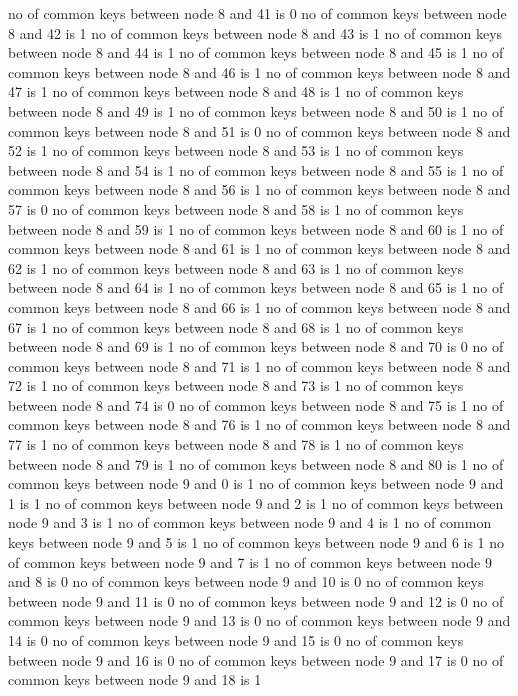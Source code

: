 no of common keys between node 8 and 41 is 0
no of common keys between node 8 and 42 is 1
no of common keys between node 8 and 43 is 1
no of common keys between node 8 and 44 is 1
no of common keys between node 8 and 45 is 1
no of common keys between node 8 and 46 is 1
no of common keys between node 8 and 47 is 1
no of common keys between node 8 and 48 is 1
no of common keys between node 8 and 49 is 1
no of common keys between node 8 and 50 is 1
no of common keys between node 8 and 51 is 0
no of common keys between node 8 and 52 is 1
no of common keys between node 8 and 53 is 1
no of common keys between node 8 and 54 is 1
no of common keys between node 8 and 55 is 1
no of common keys between node 8 and 56 is 1
no of common keys between node 8 and 57 is 0
no of common keys between node 8 and 58 is 1
no of common keys between node 8 and 59 is 1
no of common keys between node 8 and 60 is 1
no of common keys between node 8 and 61 is 1
no of common keys between node 8 and 62 is 1
no of common keys between node 8 and 63 is 1
no of common keys between node 8 and 64 is 1
no of common keys between node 8 and 65 is 1
no of common keys between node 8 and 66 is 1
no of common keys between node 8 and 67 is 1
no of common keys between node 8 and 68 is 1
no of common keys between node 8 and 69 is 1
no of common keys between node 8 and 70 is 0
no of common keys between node 8 and 71 is 1
no of common keys between node 8 and 72 is 1
no of common keys between node 8 and 73 is 1
no of common keys between node 8 and 74 is 0
no of common keys between node 8 and 75 is 1
no of common keys between node 8 and 76 is 1
no of common keys between node 8 and 77 is 1
no of common keys between node 8 and 78 is 1
no of common keys between node 8 and 79 is 1
no of common keys between node 8 and 80 is 1
no of common keys between node 9 and 0 is 1
no of common keys between node 9 and 1 is 1
no of common keys between node 9 and 2 is 1
no of common keys between node 9 and 3 is 1
no of common keys between node 9 and 4 is 1
no of common keys between node 9 and 5 is 1
no of common keys between node 9 and 6 is 1
no of common keys between node 9 and 7 is 1
no of common keys between node 9 and 8 is 0
no of common keys between node 9 and 10 is 0
no of common keys between node 9 and 11 is 0
no of common keys between node 9 and 12 is 0
no of common keys between node 9 and 13 is 0
no of common keys between node 9 and 14 is 0
no of common keys between node 9 and 15 is 0
no of common keys between node 9 and 16 is 0
no of common keys between node 9 and 17 is 0
no of common keys between node 9 and 18 is 1
